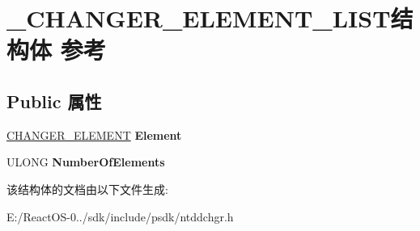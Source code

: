 \hypertarget{struct___c_h_a_n_g_e_r___e_l_e_m_e_n_t___l_i_s_t}{}\section{\+\_\+\+C\+H\+A\+N\+G\+E\+R\+\_\+\+E\+L\+E\+M\+E\+N\+T\+\_\+\+L\+I\+S\+T结构体 参考}
\label{struct___c_h_a_n_g_e_r___e_l_e_m_e_n_t___l_i_s_t}
\subsection*{Public 属性}
\begin{DoxyCompactItemize}
\item 
\mbox{\label{struct___c_h_a_n_g_e_r___e_l_e_m_e_n_t___l_i_s_t_ae90f9adc86db06c38506f84dc103059b}} 
\hyperlink{struct___c_h_a_n_g_e_r___e_l_e_m_e_n_t}{C\+H\+A\+N\+G\+E\+R\+\_\+\+E\+L\+E\+M\+E\+NT} {\bfseries Element}
\item 
\mbox{\label{struct___c_h_a_n_g_e_r___e_l_e_m_e_n_t___l_i_s_t_a99cee6877e6d43db9fc336738dbf6e26}} 
U\+L\+O\+NG {\bfseries Number\+Of\+Elements}
\end{DoxyCompactItemize}


该结构体的文档由以下文件生成\+:\begin{DoxyCompactItemize}
\item 
E\+:/\+React\+O\+S-\/0../sdk/include/psdk/ntddchgr.\+h\end{DoxyCompactItemize}
